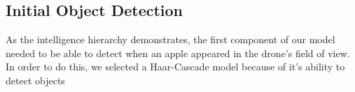 \subsection{Initial Object Detection}
As the intelligence hierarchy demonstrates, the first component of our model needed to be able to detect when an apple appeared in the drone's field of view. 
In order to do this, we selected a Haar-Cascade model because of it's ability to detect objects